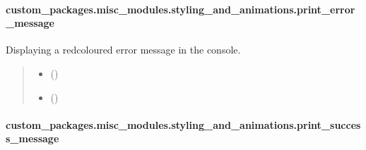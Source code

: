 \documentclass[letterpaper,10pt,english]{sphinxhowto}
\begin{document}
\sphinxstepscope


\paragraph{custom\_packages.misc\_modules.styling\_and\_animations.print\_error\_message}
\label{\detokenize{_autosummary/custom_packages.misc_modules.styling_and_animations.print_error_message:custom-packages-misc-modules-styling-and-animations-print-error-message}}\label{\detokenize{_autosummary/custom_packages.misc_modules.styling_and_animations.print_error_message::doc}}

\begin{fulllineitems}
\label{\detokenize{_autosummary/custom_packages.misc_modules.styling_and_animations.print_error_message:custom_packages.misc_modules.styling_and_animations.print_error_message}}
\pysigstartsignatures
\pysiglinewithargsret
{}
{\sphinxparamcomma {}}
{}
\pysigstopsignatures
\sphinxAtStartPar
Displaying a red\sphinxhyphen{}coloured error message in the console.
\begin{quote}\begin{description}
\begin{itemize}
\item {} 
\sphinxAtStartPar
{} ()

\item {} 
\sphinxAtStartPar
{} ()

\end{itemize}

\sphinxAtStartPar
{}

\end{description}\end{quote}

\end{fulllineitems}


\sphinxstepscope


\paragraph{custom\_packages.misc\_modules.styling\_and\_animations.print\_success\_message}
\label{\detokenize{_autosummary/custom_packages.misc_modules.styling_and_animations.print_success_message:custom-packages-misc-modules-styling-and-animations-print-success-message}}\label{\detokenize{_autosummary/custom_packages.misc_modules.styling_and_animations.print_success_message::doc}}
\end{document}
